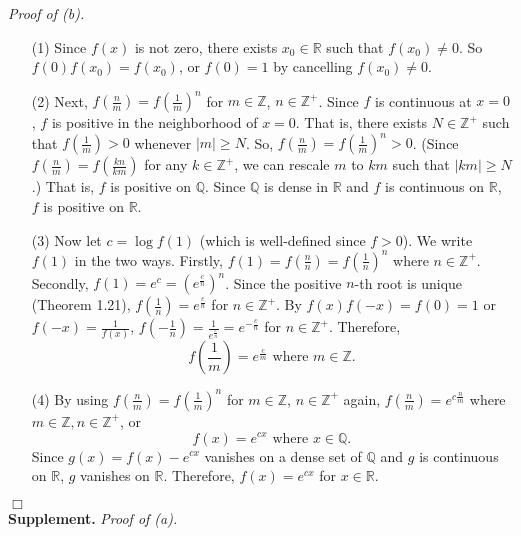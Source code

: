 \documentclass{article}
\begin{document}
\emph{Proof of (b).}
\begin{enumerate}
\item[(1)]
Since $f(x)$ is not zero, there exists $x_0 \in \mathbb{R}$ such that $f(x_0) \neq 0$.
So $f(0)f(x_0) = f(x_0)$, or $f(0) = 1$ by cancelling $f(x_0) \neq 0$.

\item[(2)]
Next, $f(\frac{n}{m}) = f(\frac{1}{m})^n$ for $m \in \mathbb{Z}$, $n \in \mathbb{Z}^{+}$.
Since $f$ is continuous at $x = 0$, $f$ is positive in the neighborhood of $x = 0$.
That is, there exists $N \in \mathbb{Z}^{+}$ such that $f(\frac{1}{m}) > 0$
whenever $|m| \geq N$.
So, $f(\frac{n}{m}) = f(\frac{1}{m})^n > 0$.
(Since $f(\frac{n}{m}) = f(\frac{kn}{km})$ for any $k \in \mathbb{Z}^{+}$,
we can rescale $m$ to $km$ such that $|km| \geq N$.)
That is, $f$ is positive on $\mathbb{Q}$.
Since $\mathbb{Q}$ is dense in $\mathbb{R}$ and $f$ is continuous on $\mathbb{R}$,
$f$ is positive on $\mathbb{R}$.

\item[(3)]
Now let $c = \log f(1)$ (which is well-defined since $f > 0$).
We write $f(1)$ in the two ways.
Firstly, $f(1) = f(\frac{n}{n}) = f(\frac{1}{n})^n$ where $n \in \mathbb{Z}^{+}$.
Secondly, $f(1) = e^c = (e^{\frac{c}{n}})^n$.
Since the positive $n$-th root is unique (Theorem 1.21),
$f(\frac{1}{n}) = e^{\frac{c}{n}}$ for $n \in \mathbb{Z}^{+}$.
By $f(x)f(-x) = f(0) = 1$ or $f(-x) = \frac{1}{f(x)}$,
$f(-\frac{1}{n}) = \frac{1}{e^{\frac{c}{n}}} = e^{-\frac{c}{n}}$ for $n \in \mathbb{Z}^{+}$.
Therefore,
\[
  f\left( \frac{1}{m} \right) = e^{\frac{c}{m}} \text{ where } m \in \mathbb{Z}.
\]

\item[(4)]
By using
$f(\frac{n}{m}) = f(\frac{1}{m})^n$ for $m \in \mathbb{Z}$, $n \in \mathbb{Z}^{+}$ again,
$f(\frac{n}{m}) = e^{c \frac{n}{m}}$ where $m \in \mathbb{Z}, n \in \mathbb{Z}^{+}$, or
$$f(x) = e^{cx} \text{ where } x \in \mathbb{Q}.$$
Since $g(x) = f(x) - e^{cx}$ vanishes on a dense set of $\mathbb{Q}$
and $g$ is continuous on $\mathbb{R}$, $g$ vanishes on $\mathbb{R}$.
Therefore, $f(x) = e^{cx}$ for $x \in \mathbb{R}$.
\end{enumerate}
$\Box$ \\



\textbf{Supplement.}
\emph{Proof of (a).}
\end{document}
